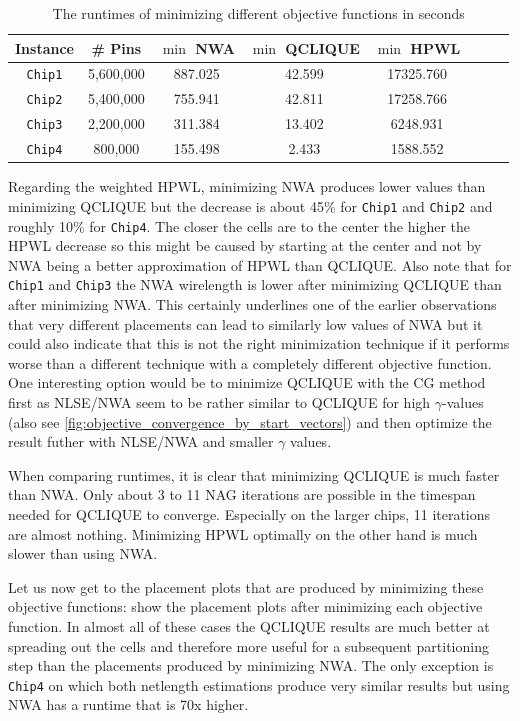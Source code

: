 \begin{table}[ht] 
 \centering
 \begin{tabular}{c c c c c c c c}
  Instance       & \# Pins   & \(\min\) NWA & \(\min\) QCLIQUE & \(\min\) HPWL \\
  \hline
  \texttt{Chip1} & 5,600,000 & 887.025        & 42.599             & 17325.760       \\
  \texttt{Chip2} & 5,400,000 & 755.941        & 42.811             & 17258.766       \\
  \texttt{Chip3} & 2,200,000 & 311.384        & 13.402             & 6248.931        \\
  \texttt{Chip4} & 800,000   & 155.498        & 2.433              & 1588.552        \\
 \end{tabular}
 \caption{The runtimes of minimizing different objective functions in seconds}
 \label{table:hpwl_qclique_runtime_comparisons}
\end{table}

Regarding the weighted HPWL, minimizing NWA produces lower values than minimizing QCLIQUE
but the decrease is about 45\% for \texttt{Chip1} and \texttt{Chip2} and roughly 10\% for \texttt{Chip4}.
The closer the cells are to the center the higher the HPWL decrease so this might be caused by starting at the center
and not by NWA being a better approximation of HPWL than QCLIQUE.
Also note that for \texttt{Chip1} and \texttt{Chip3} the NWA wirelength is lower after minimizing QCLIQUE than after minimizing NWA.
This certainly underlines one of the earlier observations that very different placements can lead to similarly low values
of NWA but it could also indicate that this is not the right minimization technique if it performs worse
than a different technique with a completely different objective function.
One interesting option would be to minimize QCLIQUE with the CG method first
as NLSE/NWA seem to be rather similar to QCLIQUE for high \(\gamma\)-values (also see \cref{fig:objective_convergence_by_start_vectors})
and then optimize the result futher with NLSE/NWA and smaller \(\gamma\) values.

When comparing runtimes, it is clear that minimizing QCLIQUE is much faster than NWA.
Only about 3 to 11 NAG iterations are possible in the timespan needed for QCLIQUE to converge.
Especially on the larger chips, 11 iterations are almost nothing.
Minimizing HPWL optimally on the other hand is much slower than using NWA.

Let us now get to the placement plots that are produced by minimizing these objective functions:
show the placement plots after minimizing each objective function.
In almost all of these cases the QCLIQUE results are much better at spreading out the cells
and therefore more useful for a subsequent partitioning step than the placements produced by minimizing NWA.
The only exception is \texttt{Chip4} on which both netlength estimations produce very similar results
but using NWA has a runtime that is 70x higher.

